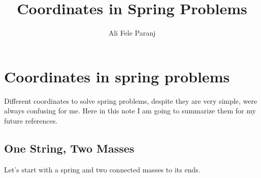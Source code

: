 \documentclass[11pt,a4paper]{article}
\title{Coordinates in Spring Problems}
\author{Ali Fele Paranj}
\begin{document}
	
\maketitle
\section{Coordinates in spring problems}
Different coordinates to solve spring problems, despite they are very simple, were always confusing for me. Here in this note I am going to summarize them for my future references.
\subsection{One String, Two Masses}
Let's start with a spring and two connected masses to its ends.
\begin{figure}[h!]
\centering
\begin{tikzpicture}[x=0.75pt,y=0.75pt,yscale=-1,xscale=1]
	

\end{tikzpicture}
\end{figure}
\end{document}
